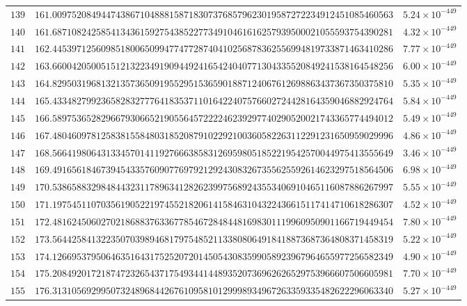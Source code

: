 \documentclass[12pt,reqno]{amsart}
\theoremstyle{remark}
\begin{document}
\begin{longtable}{clc}
$139$ & $161.0097520849447438671048881587183073768579623019587272234912451085460563$ & $5.24\times 10^{-449}$ \\
$140$ & $161.6871082425854134361592754385227734910461616257939500021055593754390281$ & $4.32\times 10^{-449}$ \\
$141$ & $162.4453971256098518006509947747728740410256878362556994819733871463410286$ & $7.77\times 10^{-449}$ \\
$142$ & $163.6600420500515121322349190944924165424040771304335520849241538164548256$ & $6.00\times 10^{-449}$ \\
$143$ & $164.8295031968132135736509195529515365901887124067612698863437367350375810$ & $5.35\times 10^{-449}$ \\
$144$ & $165.4334827992365828327776418353711016422407576602724428164359046882924764$ & $5.84\times 10^{-449}$ \\
$145$ & $166.5897536528296679306652190556457222246239297740290520021743365774494012$ & $5.49\times 10^{-449}$ \\
$146$ & $167.4804609781258381558480318520879102292100360582263112291231650959029996$ & $4.86\times 10^{-449}$ \\
$147$ & $168.5664198064313345701411927666385831269598051852219542570044975413555649$ & $3.46\times 10^{-449}$ \\
$148$ & $169.4916561846739454335760907769792129243083267355625592614623297518564506$ & $6.98\times 10^{-449}$ \\
$149$ & $170.5386588329848443231178963412826239975689243553406910465116087886267997$ & $5.55\times 10^{-449}$ \\
$150$ & $171.1975451107035619052219745521820614158463104322436615117414710618286307$ & $4.52\times 10^{-449}$ \\
$151$ & $172.4816245060270218688376336778546728484481698301119960950901166719449454$ & $7.80\times 10^{-449}$ \\
$152$ & $173.5644258413223507039894681797548521133808064918418873687364808371458319$ & $5.22\times 10^{-449}$ \\
$153$ & $174.1266953795064635164317525207201450543083599058923967964655977256582349$ & $4.90\times 10^{-449}$ \\
$154$ & $175.2084920172187472326543717549344144893520736962626529753966607506605981$ & $7.70\times 10^{-449}$ \\
$155$ & $176.3131056929950732489684426761095810129998934967263359335482622296063340$ & $5.27\times 10^{-449}$ \\

\end{longtable}
\end{document}
